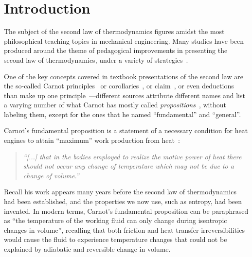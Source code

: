 \section{Introduction}

    The subject of the second law  of  thermodynamics  figures  amidst  the  most  philosophical
    teaching topics in mechanical engineering. Many studies have been produced around the  theme
    of pedagogical improvements in presenting the second law of thermodynamics, under a  variety
    of    strategies~\cite{1995-MoukalledF+NuwayhidRY-IJMEE,     1996-KaufmanR+SheldonE-AmJPhys,
    1997-BejanA-IJMEE,              1997-DunbarWR+LiorN-IJMEE,               2011-LewinsJ-IJMEE,
    2015-BeaubouefSr-IntJMechEngEduc}.

    One of the key concepts covered  in  textbook  presentations  of  the  second  law  are  the
    so-called          Carnot          principles~\cite{2013-CengelYA+BolesMA-AMGH}           or
    corollaries~\cite{2002-MoranMJ+ShapiroHN-LTC}, or  claim~\cite[p.~88]{2006-BejanA-Wiley},  or
    even deductions than make up  one  principle~\cite{1986-JonesJB+HawkinsGA-Wiley}---different
    sources attribute different names and list a varying number of what Carnot has mostly called
    \emph{propositions}~\cite{1897-ThurstonRH-Wiley}, without labeling them, except for the ones
    that he named ``fundamental'' and ``general''.

    Carnot's fundamental proposition is a statement of a necessary condition for heat engines to
    attain ``maximum'' work production from heat~\cite[p.~56]{1897-ThurstonRH-Wiley}:

    \begin{quote}
        \it
        ``[...] that in the bodies employed to realize the motive  power
        of heat there should not occur any change of  temperature  which
        may not be due to a change of volume.''
    \end{quote}

    Recall his work appears many  years  before  the  second  law  of  thermodynamics  had  been
    established, and the properties we now use, such as entropy, had been  invented.  In  modern
    terms, Carnot's fundamental proposition can be  paraphrased  as  ``the  temperature  of  the
    working fluid can only change during isentropic changes in  volume'',  recalling  that  both
    friction and heat transfer irreversibilities would cause the fluid to experience temperature
    changes that could not be explained by adiabatic and reversible change in volume.

